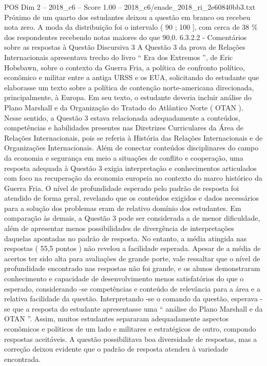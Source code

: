 \begin{textsample}{POS Dim 2 – 2018\_c6 – Score 1.00 – 2018\_c6/enade\_2018\_ri\_2e60840bb3.txt}
Próximo de um quarto dos estudantes deixou a questão em branco ou recebeu nota zero.
A moda da distribuição foi o intervalo ( 90 ; 100 ], com cerca de 38 \% dos respondentes recebendo notas maiores do que 90,0. 6.3.2.2 - Comentários sobre as respostas à Questão Discursiva 3 A Questão 3 da prova de Relações Internacionais apresentava trecho do livro “ Era dos Extremos ”, de Eric Hobsbawn, sobre o contexto da Guerra Fria, a política de confronto político, econômico e militar entre a antiga URSS e os EUA, solicitando do estudante que elaborasse um texto sobre a política de contenção norte-americana direcionada, principalmente, à Europa.
Em seu texto, o estudante deveria incluir análise do Plano Marshall e da Organização do Tratado do Atlântico Norte ( OTAN ).
Nesse sentido, a Questão 3 estava relacionada adequadamente a conteúdos, competências e habilidades presentes nas Diretrizes Curriculares da Área de Relações Internacionais, pois se referia à História das Relações Internacionais e de Organizações Internacionais.
Além de conectar conteúdos disciplinares do campo da economia e segurança em meio a situações de conflito e cooperação, uma resposta adequada à Questão 3 exigia interpretação e conhecimentos articulados com foco na recuperação da economia europeia no contexto do marco histórico da Guerra Fria.
O nível de profundidade esperado pelo padrão de resposta foi atendido de forma geral, revelando que os conteúdos exigidos e dados necessários para a solução dos problemas eram de relativo domínio dos estudantes.
Em comparação às demais, a Questão 3 pode ser considerada a de menor dificuldade, além de apresentar menos possibilidades de divergência de interpretações daquelas apontadas no padrão de resposta.
No entanto, a média atingida nas respostas ( 55,5 pontos ) não revelou a facilidade esperada.
Apesar de a média de acertos ter sido alta para avaliações de grande porte, vale ressaltar que o nível de profundidade encontrado nas respostas não foi grande, e os alunos demonstraram conhecimento e capacidade de desenvolvimento menos satisfatórios do que o esperado, considerando -se competências e conteúdo de relevância para a área e a relativa facilidade da questão.
Interpretando -se o comando da questão, esperava -se que a resposta do estudante apresentasse uma “ análise do Plano Marshall e da OTAN ”.
Assim, muitos estudantes separaram adequadamente aspectos econômicos e políticos de um lado e militares e estratégicos de outro, compondo respostas aceitáveis.
A questão possibilitava boa diversidade de respostas, mas a correção deixou evidente que o padrão de resposta atendeu à variedade encontrada.

\end{textsample}
